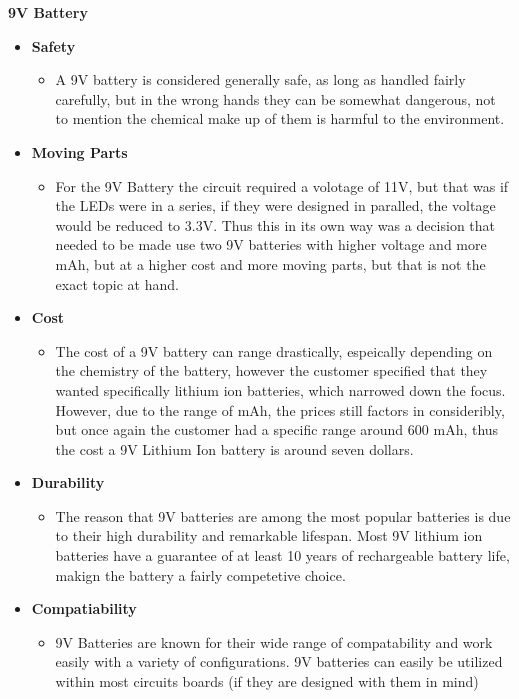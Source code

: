 \documentclass[12pt]{article}
\begin{document}
{{{{{	\noindent\textbf{9V Battery}
			{\renewcommand\labelitemi{}
				\begin{itemize}
					\item \textbf{Safety}
					\begin{itemize}
						\item A 9V battery is considered generally safe, as long as handled fairly carefully, but in the wrong hands they can be somewhat dangerous, not to mention the chemical make up of them is harmful to the environment.
					\end{itemize}
					\item \textbf{Moving Parts}
					\begin{itemize}
						\item For the 9V Battery the circuit required a volotage of 11V, but that was if the LEDs were in a series, if they were designed in paralled, the voltage would be reduced to 3.3V. Thus this in its own way was a decision that needed to be made use two 9V batteries with higher voltage and more mAh, but at a higher cost and more moving parts, but that is not the exact topic at hand.
					\end{itemize}
					\item \textbf{Cost}
					\begin{itemize}
						\item The cost of a 9V battery can range drastically, espeically depending on the chemistry of the battery, however the customer specified that they wanted specifically lithium ion batteries, which narrowed down the focus. However, due to the range of mAh, the prices still factors in consideribly, but once again the customer had a specific range around 600 mAh, thus the cost a 9V Lithium Ion battery is around seven dollars.
					\end{itemize}
					\item \textbf{Durability}
					\begin{itemize}
						\item The reason that 9V batteries are among the most popular batteries is due to their high durability and remarkable lifespan. Most 9V lithium ion batteries have a guarantee of at least 10 years of rechargeable battery life, makign the battery a fairly competetive choice. 
					\end{itemize}
					\item \textbf{Compatiability}
					\begin{itemize}
						\item 9V Batteries are known for their wide range of compatability and work easily with a variety of configurations. 9V batteries can easily be utilized within most circuits boards (if they are designed with them in mind)

\end{itemize}
\end{itemize}}}}}}}
\end{document}
